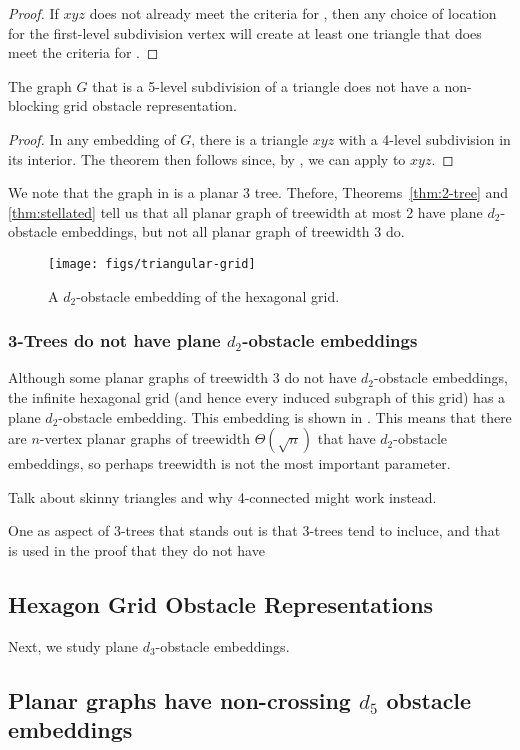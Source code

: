 \documentclass{patmorin}
\begin{document}
\begin{proof}
   If $xyz$ does not already meet the criteria for , then
   any choice of location for the first-level subdivision vertex will create
   at least one triangle that does meet the criteria for .
\end{proof}

\begin{thm}
   The graph $G$ that is a 5-level subdivision of a triangle does not
   have a non-blocking grid obstacle representation.
\end{thm}

\begin{proof}
   In any embedding of $G$, there is a triangle $xyz$ with a 4-level
   subdivision in its interior.  The theorem then follows since, by
   , we can apply  to $xyz$.
\end{proof}

We note that the graph in  is a planar 3 tree.
Thefore, Theorems~\ref{thm:2-tree} and \ref{thm:stellated} tell us that
all planar graph of treewidth at most 2 have plane $d_2$-obstacle embeddings,
but not all planar graph of treewidth 3 do.

\begin{figure}
   \begin{center}
      \texttt{[image: figs/triangular-grid]}
   \end{center}
   \caption{A $d_2$-obstacle embedding of the hexagonal grid.}
\end{figure}


\subsubsection{3-Trees do not have plane $d_2$-obstacle embeddings}

Although some planar graphs of treewidth 3 do not have $d_2$-obstacle
embeddings, the infinite hexagonal grid (and hence every induced subgraph
of this grid) has a plane $d_2$-obstacle embedding.  This embedding
is shown in .  This means that there are $n$-vertex
planar graphs of treewidth $\Theta(\sqrt{n})$ that have $d_2$-obstacle
embeddings, so perhaps treewidth is not the most important parameter.

Talk about skinny triangles and why 4-connected might work instead.



One as aspect of 3-trees that stands out is that 3-trees tend to incluce, and that is used in the proof that they do not have 



\subsection{Hexagon Grid Obstacle Representations}
 
Next, we study plane $d_3$-obstacle embeddings.

\begin{thm}
   
\end{thm}

\subsection{Planar graphs have non-crossing $d_5$ obstacle embeddings}




\end{document}
